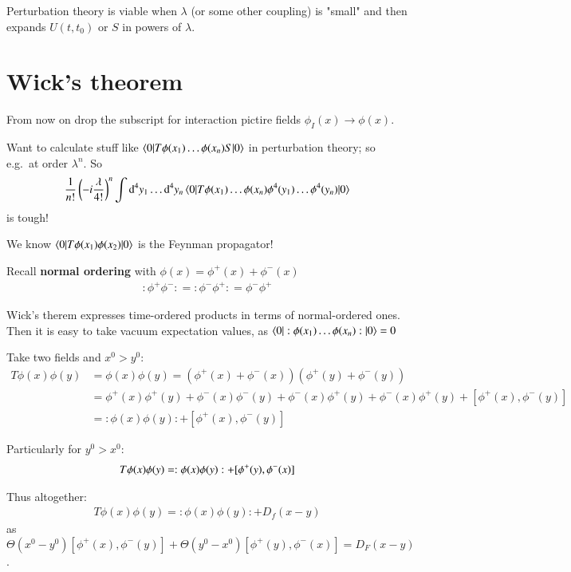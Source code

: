 Perturbation theory is viable when $\lambda$ (or some other coupling) is "small" and then expands $U(t,t_0)$ or $S$ in powers of $\lambda$.

\section{Wick's theorem}
From now on drop the subscript for interaction pictire fields $\phi_I(x) \rightarrow \phi(x)$.

Want to calculate stuff like $\braket{0 | T\phi(x_1)\dots\phi(x_n)S | 0}$ in perturbation theory; so e.g.\ at order $\lambda^n$. So 
\begin{align}
\frac{1}{n!} \left( -i\frac{\lambda}{4!} \right)^n \int \dd^4 y_1 \dots \dd^4 y_n \braket{0 | T\phi(x_1)\dots\phi(x_n)\phi^4(y_1)\dots\phi^4(y_n) | 0}
\end{align}
is tough!

We know $\braket{0 | T\phi(x_1)\phi(x_2) | 0 } $ is the Feynman propagator!

Recall \textbf{normal ordering} with $\phi(x) = \phi^+(x) + \phi^-(x)$
\begin{align}
	:\phi^+ \phi^-: = :\phi^- \phi^+: = \phi^- \phi^+
\end{align} 

Wick's therem expresses time-ordered products in terms of normal-ordered ones. Then it is easy to take vacuum expectation values, as $\braket{0 | :\phi(x_1)\dots\phi(x_n):|0} = 0$

Take two fields and $x^0 > y^0$:
\begin{align*}
	T \phi(x)\phi(y) &= \phi(x)\phi(y) = \left(\phi^+(x)+\phi^-(x)\right)\left(\phi^+(y)+\phi^-(y)\right) \\
	&= \phi^+(x)\phi^+(y) + \phi^-(x)\phi^-(y) + \phi^-(x) \phi^+(y) + \phi^-(x) \phi^+(y) + [\phi^+(x), \phi^-(y)] \\
	&= :\phi(x)\phi(y): + [\phi^+(x),\phi^-(y)]
\end{align*} 

Particularly for $y^0 > x^0$: 
\begin{align}
	T\phi(x)\phi(y) = :\phi(x)\phi(y): + [\phi^+(y),\phi^-(x)] \notag
\end{align}

Thus altogether: 
\begin{align}
	T\phi(x)\phi(y) = :\phi(x)\phi(y): + D_f(x-y)
\end{align}
as $\Theta(x^0 - y^0) [\phi^+(x), \phi^-(y)] + \Theta(y^0 - x^0) [\phi^+(y), \phi^-(x)] = D_F(x-y)$.

